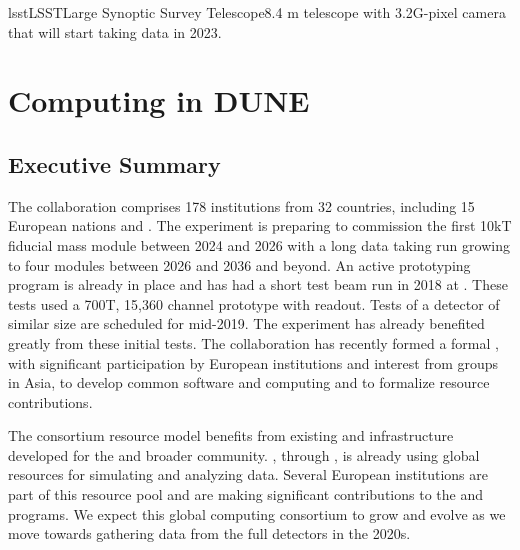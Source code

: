\newcommand{\ldshort}[1]{{\bf{[#1]}}\todo{define abbr #1}}
\newcommand{\lcite}[1]{\cite{#1}}
\newcommand{\ignore}[1]

\newduneabbrev{lsst}{LSST}{Large Synoptic Survey Telescope}{8.4 m telescope with 3.2G-pixel camera that will start taking data in 2023.}

\chapter{Computing in DUNE}
\label{ch:exec-comp}

\section{Executive Summary}
\label{ch:exec-comp-es}

The   collaboration comprises 178 institutions from 32 countries, including 15 European nations and . The experiment is preparing to commission the first 10kT  fiducial mass   module between 2024 and 2026 with a long data taking run growing to four modules between 2026 and 2036 and beyond.  An active prototyping program is already in place and has had  a short test beam run in 2018 at .  These tests used  a 700T, 15,360 channel prototype  with  readout.  Tests of a  detector of similar size are scheduled for mid-2019.   The  experiment has already  benefited greatly from these initial tests.  The collaboration has recently formed a formal , with significant participation by European institutions and interest from groups in Asia, to develop common software and computing and to formalize resource contributions.

The consortium resource model benefits from existing   and  infrastructure developed for the  and broader  community.  , through  , is already using global resources for simulating and analyzing   data.  Several European institutions are part of this resource pool and are making significant contributions to the  and  programs.  We expect this global computing consortium to grow and evolve as we move towards gathering data from the full  detectors in the 2020s.

